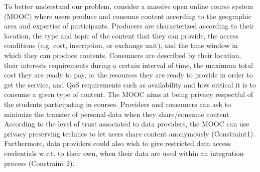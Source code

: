  

To better understand our problem, consider a massive open online course system (MOOC) where users produce and consume content according to the geographic area and expertise of participants. 
Producers are characterized according to their location, the type and topic of the content that they can provide, the access conditions (e.g. cost, inscription, or exchange unit), and the time window in which they can produce contents. 
Consumers are described by their location, their interests requirements during a certain interval of time, the maximum total cost they are ready to pay, or the resources they are ready to provide in order to get the service, and QoS requirements such as availability and how critical it is to consume a given type of content. 
The MOOC  aims at being privacy respectful of the students participating in courses.
 Providers  and consumers can ask to minimize the transfer of personal data  when they share/consume content.  According to the level of trust associated to data providers, the MOOC can use privacy preserving technics to let users share content anonymously  (Constraint1). Furthermore,  data providers could  also wish to give restricted data access credentials w.r.t. to their own, when their data are used  within  an integration process (Constraint 2).  
 
